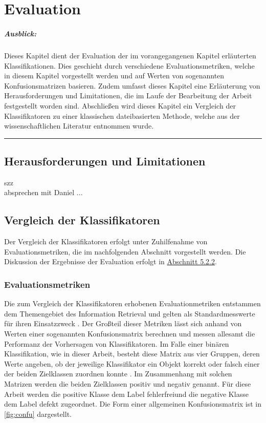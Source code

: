 
\chapter{Evaluation}
\label{evaluation}

\paragraph{Ausblick:}
Dieses Kapitel dient der Evaluation der im vorangegangenen Kapitel erläuterten Klassifikationen. Dies geschieht durch verschiedene Evaluationsmetriken, welche in diesem Kapitel vorgestellt werden und auf Werten von sogenannten Konfusionsmatrizen basieren. Zudem umfasst dieses Kapitel eine Erläuterung von Herausforderungen und Limitationen, die im Laufe der Bearbeitung der Arbeit festgestellt worden sind. Abschließen wird dieses Kapitel ein Vergleich der Klassifikatoren zu einer klassischen dateibasierten Methode, welche aus der wissenschaftlichen Literatur entnommen wurde.
\\
\hrule

\section{Herausforderungen und Limitationen}

szz \\
absprechen mit Daniel
...

\section{Vergleich der Klassifikatoren}

Der Vergleich der Klassifikatoren erfolgt unter Zuhilfenahme von Evaluationsmetriken, die im nachfolgenden Abschnitt vorgestellt werden. Die Diskussion der Ergebnisse der Evaluation erfolgt in \hyperref[results]{Abschnitt 5.2.2}.

\subsection{Evaluationsmetriken}
\label{eval-metrics}

Die zum Vergleich der Klassifikatoren erhobenen Evaluationmetriken entstammen dem Themengebiet des Information Retrieval und gelten als Standardmesswerte für ihren Einsatzzweck \cite{Sammut2017}. Der Großteil dieser Metriken lässt sich anhand von Werten einer sogenannten Konfusionsmatrix berechnen und messen allesamt die Performanz der Vorhersagen von Klassifikatoren. Im Falle einer binären Klassifikation, wie in dieser Arbeit, besteht diese Matrix aus vier Gruppen, deren Werte angeben, ob der jeweilige Klassifikator ein Objekt korrekt oder falsch einer der beiden Zielklassen zuordnen konnte \cite{Sammut2017}. Im Zusammenhang mit solchen Matrizen werden die beiden Zielklassen \glqq positiv\grqq{} und \glqq negativ\grqq{} genannt. Für diese Arbeit werden die positive Klasse dem Label \glqq fehlerfrei\grqq und die negative Klasse dem Label \glqq defekt\grqq{} zugeordnet. Die Form einer allgemeinen Konfusionsmatrix ist in \autoref{fig:confu} dargestellt.


